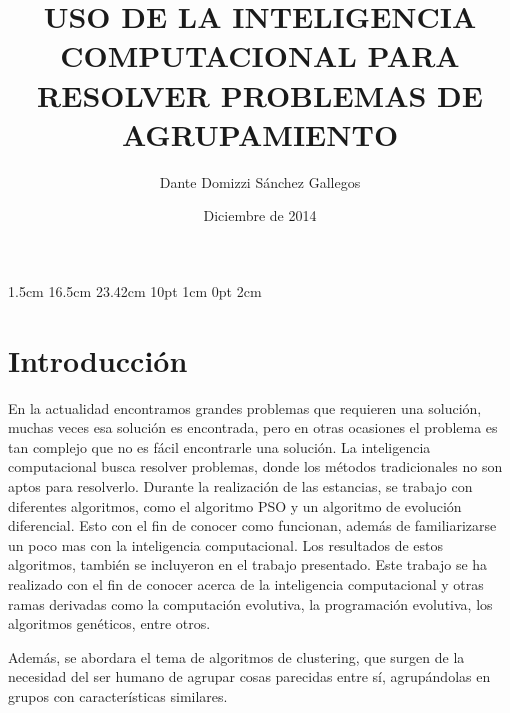 \documentclass[
]{article}
\title{USO DE LA INTELIGENCIA COMPUTACIONAL PARA RESOLVER PROBLEMAS DE AGRUPAMIENTO}
\author{Dante Domizzi Sánchez Gallegos}
\date{Diciembre de 2014}
\begin{document}
\setmargins{2.5cm}       %
{1.5cm}                        %
{16.5cm}                      %
{23.42cm}                    %
{10pt}                           %
{1cm}                           %
{0pt}                             %
{2cm}                           %


\maketitle 
\setcounter{tocdepth}{2} %
\newpage
\tableofcontents 
\listoffigures
\listoftables 

\listofalgorithms
\newpage
\section{Introducción}
En la actualidad encontramos grandes problemas que requieren una solución, muchas veces esa solución es encontrada, pero en otras ocasiones el problema es tan complejo que no es fácil encontrarle una solución. La inteligencia computacional busca resolver problemas, donde los métodos tradicionales no son aptos para resolverlo. 
\newline
\newline
Durante la realización de las estancias, se trabajo con diferentes algoritmos, como el algoritmo PSO y un algoritmo de evolución diferencial. Esto con el fin de conocer como funcionan, además de familiarizarse un poco mas con la inteligencia computacional.
Los resultados de estos algoritmos, también se incluyeron en el trabajo presentado.
\newline
\newline
Este trabajo se ha realizado con el fin de conocer acerca de la inteligencia computacional y otras ramas derivadas como la computación evolutiva, la programación evolutiva, los algoritmos genéticos, entre otros.
\newline
\newline

Además, se abordara el tema de algoritmos de clustering, que surgen de la necesidad del ser humano de agrupar cosas parecidas entre sí, agrupándolas en grupos con características similares.
\newline
\newline
\end{document}
